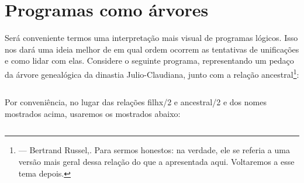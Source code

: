 

%



%
%
%


%

\section{Programas como árvores}

Será conveniente termos uma interpretação mais visual de programas lógicos. Isso nos dará uma ideia melhor de em qual ordem ocorrem as tentativas de unificações e como lidar com elas.
Considere o seguinte programa, representando um pedaço da árvore genealógica da dinastia Julio-Claudiana, junto com a relação ancestral\footnote{ --- Bertrand Russel,.
Para sermos honestos: na verdade, ele se referia a uma versão mais geral dessa relação do que a apresentada aqui. Voltaremos a esse tema depois.}:

    \begin{listing}
\inputminted{prolog}{../Exemplos/Cap5/prog1_ancestor.pl}
    \end{listing}

Por conveniência, no lugar das relações filhx/2 e ancestral/2 e dos nomes mostrados acima, usaremos os mostrados abaixo:

    \begin{listing}
\inputminted{prolog}{../Exemplos/Cap5/prog2_ancestor.pl}
    \end{listing}


